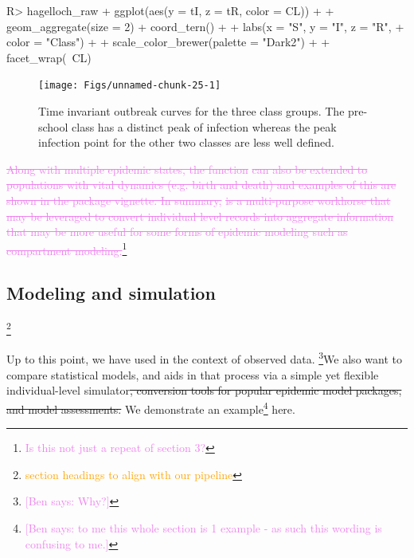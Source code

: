 \documentclass[
  shortnames]{jss}
\begin{document}
\begin{CodeChunk}
\begin{CodeInput}
R> hagelloch_raw %
+   ggplot(aes(y = tI, z = tR, color = CL)) +
+   geom_aggregate(size = 2) + coord_tern() +
+   labs(x = "S", y = "I", z = "R",
+        color = "Class") +
+   scale_color_brewer(palette = "Dark2") +
+   facet_wrap(~CL)
\end{CodeInput}
\begin{figure}[H]

{\centering \texttt{[image: Figs/unnamed-chunk-25-1]} 

}

\caption{\label{fig:tern-class-data}Time invariant outbreak curves for the three class groups.  The pre-school class has a distinct peak of infection whereas the peak infection point for the other two classes are less well defined.}\label{fig:unnamed-chunk-25}
\end{figure}
\end{CodeChunk}

\textcolor{violet}{\sout{Along with multiple epidemic states, the function}}
\textcolor{violet}{\sout{can also be extended to populations with vital dynamics (e.g. birth and death) and examples of this are shown in the package vignette.  In summary, }}
\textcolor{violet}{\sout{is a multi-purpose workhorse that may be leveraged to convert individual level records into aggregate information that may be more useful for some forms of epidemic modeling such as compartment modeling.}}\footnote{\textcolor{violet}{Is this not just a repeat of section 3?}}

\hypertarget{modeling-and-simulation-1}{%
\subsection{Modeling and simulation}\label{modeling-and-simulation-1}}

\footnote{\textcolor{orange}{section headings to align with our pipeline}}

Up to this point, we have used  in the context of
observed data. \footnote{\textcolor{violet}{[Ben says: Why?]}}We also
want to compare statistical models, and  aids in that
process via a simple yet flexible individual-level
simulator\sout{, conversion tools for popular epidemic model packages, and model assessments.}
We demonstrate an
example\footnote{\textcolor{violet}{[Ben says: to me this whole section is 1 example - as such this wording is confusing to me.]}}
here.
\end{document}
